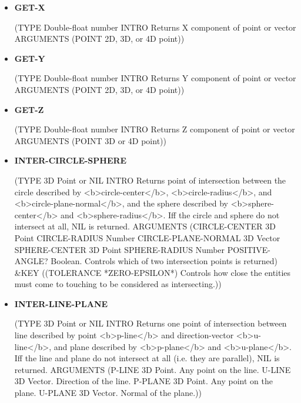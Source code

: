 \documentclass [11pt]{book}
\begin{document}
\begin{itemize}
\item {}
\label{prim:get-x}
\textbf{GET-X}

(TYPE Double-float number INTRO  Returns X component of point or vector
 ARGUMENTS (POINT 2D, 3D, or 4D point))



\item {}
\label{prim:get-y}
\textbf{GET-Y}

(TYPE Double-float number INTRO  Returns Y component of point or vector
 ARGUMENTS (POINT 2D, 3D, or 4D point))



\item {}
\label{prim:get-z}
\textbf{GET-Z}

(TYPE Double-float number INTRO  Returns Z component of point or vector
 ARGUMENTS (POINT 3D or 4D point))



\item {}
\label{prim:inter-circle-sphere}
\textbf{INTER-CIRCLE-SPHERE}

(TYPE 3D Point or NIL INTRO  Returns point of intersection between the circle described by <b>circle-center</b>,
<b>circle-radius</b>, and <b>circle-plane-normal</b>, and the sphere described by <b>sphere-center</b>
and <b>sphere-radius</b>. Iff the circle and sphere do not intersect at all, NIL is returned.
 ARGUMENTS (CIRCLE-CENTER 3D Point CIRCLE-RADIUS Number CIRCLE-PLANE-NORMAL 3D Vector SPHERE-CENTER 3D Point SPHERE-RADIUS Number POSITIVE-ANGLE? Boolean. Controls which of two intersection points is returned) \&KEY ((TOLERANCE *ZERO-EPSILON*) Controls how close the entities must come to touching to be 
considered as intersecting.))



\item {}
\label{prim:inter-line-plane}
\textbf{INTER-LINE-PLANE}

(TYPE 3D Point or NIL INTRO  Returns one point of intersection between line described by
point <b>p-line</b> and direction-vector <b>u-line</b>, and plane described by
<b>p-plane</b> and <b>u-plane</b>. Iff the line and plane do not intersect at
all (i.e. they are parallel), NIL is returned.
 ARGUMENTS (P-LINE 3D Point. Any point on the line. U-LINE 3D Vector. Direction of the line. P-PLANE 3D Point. Any point on the plane. U-PLANE 3D Vector. Normal of the plane.))




\end{itemize}
\end{document}
